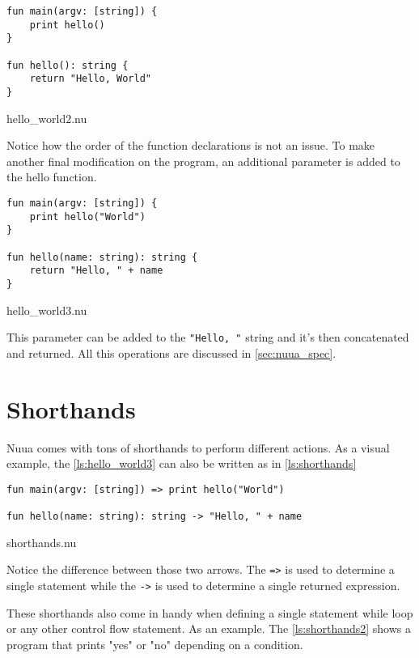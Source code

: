 \begin{code}
\begin{verbatim}
fun main(argv: [string]) {
    print hello()
}

fun hello(): string {
    return "Hello, World"
}
\end{verbatim}
\caption{hello\_world2.nu}
\label{ls:hello_world2}
\end{code}

Notice how the order of the function declarations is not an issue. To make another final modification on the program, an additional parameter is added
to the hello function.\\

\begin{code}
\begin{verbatim}
fun main(argv: [string]) {
    print hello("World")
}

fun hello(name: string): string {
    return "Hello, " + name
}
\end{verbatim}
\caption{hello\_world3.nu}
\label{ls:hello_world3}
\end{code}

This parameter can be added to the \texttt{"Hello, "} string and it's then concatenated and returned.
All this operations are discussed in \autoref{sec:nuua_spec}.

\section{Shorthands}

Nuua comes with tons of shorthands to perform different actions. As a visual example, the \autoref{ls:hello_world3} can also be written as in
\autoref{ls:shorthands}\\

\begin{code}
\begin{verbatim}
fun main(argv: [string]) => print hello("World")

fun hello(name: string): string -> "Hello, " + name
\end{verbatim}
\caption{shorthands.nu}
\label{ls:shorthands}
\end{code}

Notice the difference between those two arrows. The \texttt{=>} is used to determine a single statement while the \texttt{->} is used to determine a single
returned expression.

These shorthands also come in handy when defining a single statement while loop or any other control flow statement. As an example. The \autoref{ls:shorthands2}
shows a program that prints "yes" or "no" depending on a condition.\\

